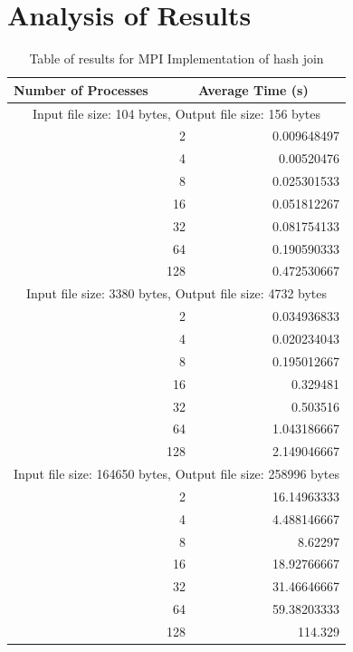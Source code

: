 \documentclass[journal,draftclsnofoot,11pt]{IEEEtran}
\begin{document}
\section{Analysis of Results}\label{ana}
\begin{table}[htbp]
  \centering
  \caption{Table of results for MPI Implementation of hash join}
    \begin{tabular}{|r|r|}
    \hline
    \multicolumn{1}{|l|}{\textbf{Number of Processes}} & \multicolumn{1}{l|}{\textbf{Average Time (s)}} \\
    \hline
    \multicolumn{2}{|c|}{Input file size: 104 bytes, Output file size: 156 bytes} \\
    \hline
    2     & 0.009648497 \\
    \hline
    4     & 0.00520476 \\
    \hline
    8     & 0.025301533 \\
    \hline
    16    & 0.051812267 \\
    \hline
    32    & 0.081754133 \\
    \hline
    64    & 0.190590333 \\
    \hline
    128   & 0.472530667 \\
    \hline
    \multicolumn{2}{|c|}{Input file size: 3380 bytes, Output file size: 4732 bytes} \\
    \hline
    2     & 0.034936833 \\
    \hline
    4     & 0.020234043 \\
    \hline
    8     & 0.195012667 \\
    \hline
    16    & 0.329481 \\
    \hline
    32    & 0.503516 \\
    \hline
    64    & 1.043186667 \\
    \hline
    128   & 2.149046667 \\
    \hline
    \multicolumn{2}{|c|}{Input file size: 164650 bytes, Output file size: 258996 bytes} \\
    \hline
    2     & 16.14963333 \\
    \hline
    4     & 4.488146667 \\
    \hline
    8     & 8.62297 \\
    \hline
    16    & 18.92766667 \\
    \hline
    32    & 31.46646667 \\
    \hline
    64    & 59.38203333 \\
    \hline
    128   & 114.329 \\
    \hline
    \end{tabular}%
  \label{tab:addlabel}%
\end{table}%
\end{document}
